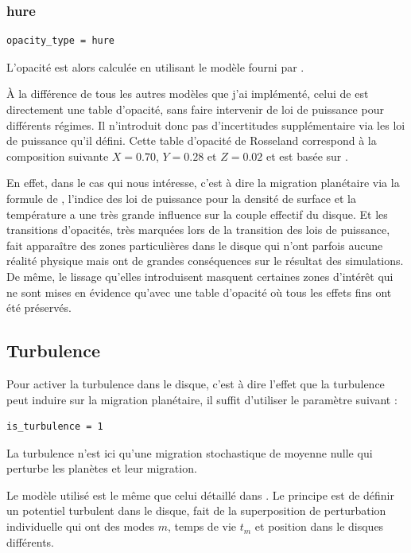 \subsubsection{hure}
\begin{verbatim}
opacity_type = hure
\end{verbatim}

L'opacité est alors calculée en utilisant le modèle fourni par \cite{hure2000transition}. 

À la différence de tous les autres modèles que j'ai implémenté, celui de \cite{hure2000transition} est directement une table d'opacité, sans faire intervenir de loi de puissance pour différents régimes. Il n'introduit donc pas d'incertitudes supplémentaire via les loi de puissance qu'il défini. Cette table
d'opacité de Rosseland correspond à la composition suivante $X=0.70$, $Y=0.28$ et $Z=0.02$ et est basée sur
\cite{seaton1994opacities, alexander1994low, henning1996dust}.

En effet, dans le cas qui nous intéresse, c'est à dire la migration planétaire via la formule de \citep{paardekooper2011torque}, l'indice des loi de puissance pour la densité de surface et la température a une très grande influence sur la couple effectif du disque. Et les transitions d'opacités, très marquées lors de la transition des lois de puissance, fait apparaître des zones particulières dans le disque qui n'ont parfois aucune réalité physique mais ont de grandes conséquences sur le résultat des simulations. De même, le lissage qu'elles introduisent masquent certaines zones d'intérêt qui ne sont mises en évidence qu'avec une table d'opacité où tous les effets fins ont été préservés.

\subsection{Turbulence}
Pour activer la turbulence dans le disque, c'est à dire l'effet que la turbulence peut induire sur la migration planétaire, il suffit d'utiliser le paramètre suivant : 
\begin{verbatim}
is_turbulence = 1
\end{verbatim}

La turbulence n'est ici qu'une migration stochastique de moyenne nulle qui perturbe les planètes et leur migration. 

Le modèle utilisé est le même que celui détaillé dans \cite{ogihara2007accretion}. Le principe est de définir un potentiel turbulent dans le disque, fait de la superposition de perturbation individuelle qui ont des modes $m$, temps de vie $t_m$ et position dans le disques différents. 

